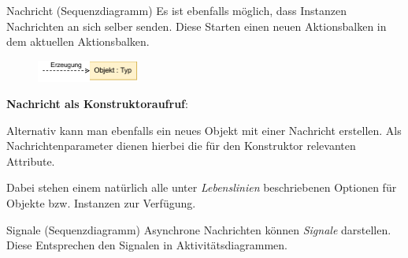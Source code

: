 \begin{diag}{Nachricht (Sequenzdiagramm)}
    Es ist ebenfalls möglich, dass Instanzen Nachrichten an sich selber senden.
    Diese Starten einen neuen Aktionsbalken in dem aktuellen Aktionsbalken.

    \begin{figure}
        \centering
        \includegraphics[width=0.3\textwidth]{includes/figures/defi_diagrams_sequenz_message_create.pdf}
    \end{figure}
    \textbf{Nachricht als Konstruktoraufruf}:

    Alternativ kann man ebenfalls ein neues Objekt mit einer Nachricht erstellen.
    Als Nachrichtenparameter dienen hierbei die für den Konstruktor relevanten Attribute.

    Dabei stehen einem natürlich alle unter \emph{Lebenslinien} beschriebenen Optionen für Objekte bzw. Instanzen zur Verfügung.
\end{diag}

\begin{bonus}{Signale (Sequenzdiagramm)}
    Asynchrone Nachrichten können \emph{Signale} darstellen.
    Diese Entsprechen den Signalen in Aktivitätsdiagrammen.
\end{bonus}

